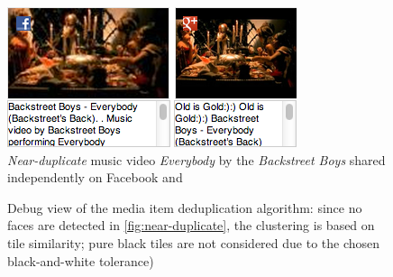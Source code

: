 \begin{figure}[!h]
  \centering
  \includegraphics[width=0.9\linewidth]{./backstreetboys.png}
  \caption[\emph{Near-duplicate} music video \emph{Everybody} by the \emph{Backstreet Boys}]{\emph{Near-duplicate} music video \emph{Everybody} by the \emph{Backstreet Boys} shared independently on Facebook and \googleplus}
  \label{fig:near-duplicate}
\end{figure}

\begin{figure}[!h]
  \centering
  \caption[Debug view of the media item deduplication algorithm]{Debug view of the media item deduplication algorithm:
  since no faces are detected in \autoref{fig:near-duplicate},
  the clustering is based on tile similarity;
  pure black tiles are not considered due to the chosen black-and-white tolerance)}
  \label{fig:algorithmdebugtilesimilarity}
\end{figure}

